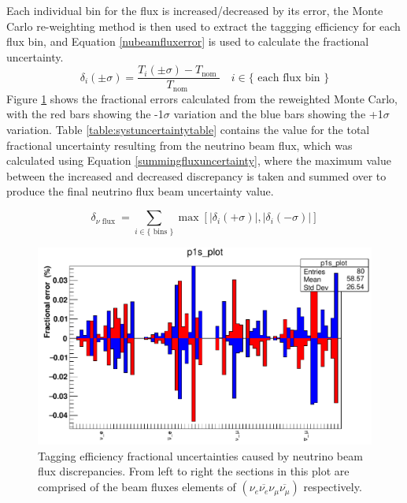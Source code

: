 \documentclass{article}
\begin{document}
Each individual bin for the flux is increased/decreased by its error, the Monte Carlo re-weighting method is then used to extract the taggging efficiency for each flux bin, and Equation \eqref{nubeamfluxerror} is used to calculate the fractional uncertainty.
\newline
\begin{equation}
    \delta_{i}(\pm \sigma)=\frac{T_{i}(\pm \sigma)-T_{\text {nom }}}{T_{\text {nom }}} \quad i \in\{\text { each flux bin }\}
\label{nubeamfluxerror}
\end{equation}
\newline
Figure \ref{fig:fluxuncertainty} shows the fractional errors calculated from the reweighted Monte Carlo, with the red bars showing the -1$\sigma$ variation and the blue bars showing the +1$\sigma$ variation. Table \ref{table:systuncertaintytable} contains the value for the total fractional uncertainty resulting from the neutrino beam flux, which was calculated using Equation \eqref{summingfluxuncertainty}, where the maximum value between the increased and decreased discrepancy is taken and summed over to produce the final neutrino flux beam uncertainty value.
\newline

\begin{equation}
    \delta_{\nu \text { flux }}=\sum_{i \in\{\text { bins }\}} \max \left[\left|\delta_{i}(+\sigma)\right|,\left|\delta_{i}(-\sigma)\right|\right]
 \label{summingfluxuncertainty}   
\end{equation}

\begin{figure}[h!]
\includegraphics[scale=0.4]{flux_uncertainty.png}
\caption{Tagging efficiency fractional uncertainties caused by neutrino beam flux discrepancies. From left to right the sections in this plot are comprised of the beam fluxes elements of $\left(\nu_{e} \overline{\nu_{e}} \nu_{\mu} \overline{\nu_{\mu}}\right)$ respectively.}
\label{fig:fluxuncertainty}
\end{figure}
\end{document}
